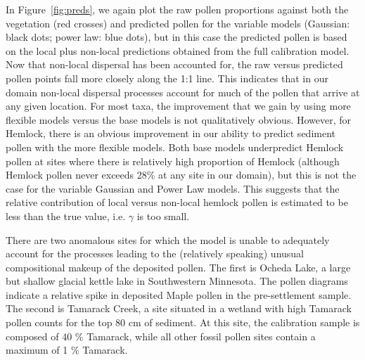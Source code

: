 \documentclass[12pt]{article}
\begin{document}
In Figure~\ref{fig:preds}, we again plot the raw pollen proportions
against both the vegetation (red crosses) and predicted pollen for the
variable models (Gaussian: black dots; power law: blue dots), but in
this case the predicted pollen is based on the local plus non-local
predictions obtained from the full calibration model. Now that
non-local dispersal has been accounted for, the raw versus predicted
pollen points fall more closely along the 1:1 line. This indicates
that in our domain non-local dispersal processes account for much of
the pollen that arrive at any given location. For most taxa, the
improvement that we gain by using more flexible models versus the base
models is not qualitatively obvious. However, for Hemlock, there is an
obvious improvement in our ability to predict sediment pollen with the
more flexible models. Both base models underpredict Hemlock pollen at
sites where there is relatively high proportion of Hemlock (although
Hemlock pollen never exceeds 28\% at any site in our domain), but this
is not the case for the variable Gaussian and Power Law models. This
suggests that the relative contribution of local versus non-local
hemlock pollen is estimated to be less than the true value,
i.e. $\gamma$ is too small.

There are two anomalous sites for which the model is unable to
adequately account for the processes leading to the (relatively
speaking) unusual compositional makeup of the deposited pollen. The
first is Ocheda Lake, a large but shallow glacial kettle lake in
Southwestern Minnesota. The pollen diagrams indicate a relative spike
in deposited Maple pollen in the pre-settlement sample. The second is
Tamarack Creek, a site situated in a wetland with high Tamarack pollen
counts for the top 80 cm of sediment. At this site, the calibration
sample is composed of 40 \% Tamarack, while all other fossil pollen
sites contain a maximum of 1 \% Tamarack.
\end{document}

